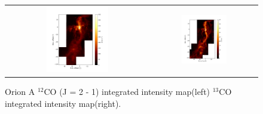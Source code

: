 \begin{figure}[h]
	\begin{center}
		\begin{tabular}{cc}
			\includegraphics[width=0.45\textwidth]{RNE_12CO_Orion} & \includegraphics[width=0.45\textwidth]{Orion_13CO_intmap}
		\end{tabular}
	\end{center}
	\caption{Orion A $^{12}$CO (J = 2 - 1) integrated intensity map(left) $^{13}$CO integrated intensity map(right).}
	\label{fig:map1}  %
\end{figure}

